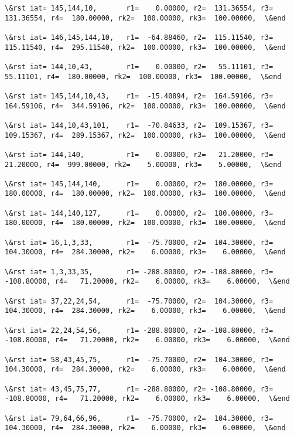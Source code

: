 \documentclass[11pt]{article}
\begin{document}
\begin{Verbatim}[commandchars=\\\{\}]
\&rst iat= 145,144,10,       r1=    0.00000, r2=  131.36554, r3=  131.36554, r4=  180.00000, rk2=  100.00000, rk3=  100.00000,  \&end

\&rst iat= 146,145,144,10,   r1=  -64.88460, r2=  115.11540, r3=  115.11540, r4=  295.11540, rk2=  100.00000, rk3=  100.00000,  \&end

\&rst iat= 144,10,43,        r1=    0.00000, r2=   55.11101, r3=   55.11101, r4=  180.00000, rk2=  100.00000, rk3=  100.00000,  \&end

\&rst iat= 145,144,10,43,    r1=  -15.40894, r2=  164.59106, r3=  164.59106, r4=  344.59106, rk2=  100.00000, rk3=  100.00000,  \&end

\&rst iat= 144,10,43,101,    r1=  -70.84633, r2=  109.15367, r3=  109.15367, r4=  289.15367, rk2=  100.00000, rk3=  100.00000,  \&end

\&rst iat= 144,140,          r1=    0.00000, r2=   21.20000, r3=   21.20000, r4=  999.00000, rk2=    5.00000, rk3=    5.00000,  \&end

\&rst iat= 145,144,140,      r1=    0.00000, r2=  180.00000, r3=  180.00000, r4=  180.00000, rk2=  100.00000, rk3=  100.00000,  \&end

\&rst iat= 144,140,127,      r1=    0.00000, r2=  180.00000, r3=  180.00000, r4=  180.00000, rk2=  100.00000, rk3=  100.00000,  \&end

\&rst iat= 16,1,3,33,        r1=  -75.70000, r2=  104.30000, r3=  104.30000, r4=  284.30000, rk2=    6.00000, rk3=    6.00000,  \&end

\&rst iat= 1,3,33,35,        r1= -288.80000, r2= -108.80000, r3= -108.80000, r4=   71.20000, rk2=    6.00000, rk3=    6.00000,  \&end

\&rst iat= 37,22,24,54,      r1=  -75.70000, r2=  104.30000, r3=  104.30000, r4=  284.30000, rk2=    6.00000, rk3=    6.00000,  \&end

\&rst iat= 22,24,54,56,      r1= -288.80000, r2= -108.80000, r3= -108.80000, r4=   71.20000, rk2=    6.00000, rk3=    6.00000,  \&end

\&rst iat= 58,43,45,75,      r1=  -75.70000, r2=  104.30000, r3=  104.30000, r4=  284.30000, rk2=    6.00000, rk3=    6.00000,  \&end

\&rst iat= 43,45,75,77,      r1= -288.80000, r2= -108.80000, r3= -108.80000, r4=   71.20000, rk2=    6.00000, rk3=    6.00000,  \&end

\&rst iat= 79,64,66,96,      r1=  -75.70000, r2=  104.30000, r3=  104.30000, r4=  284.30000, rk2=    6.00000, rk3=    6.00000,  \&end


\end{Verbatim}
\end{document}
